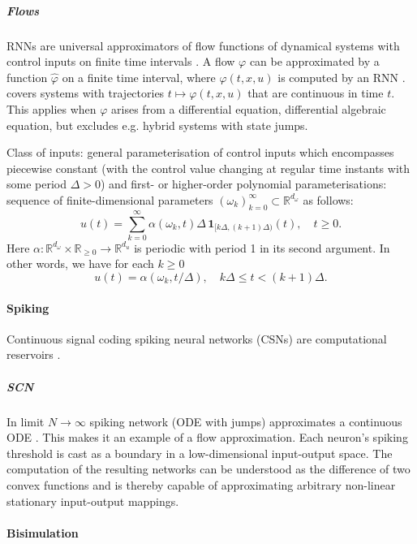 \documentclass{article}
\theoremstyle{definition}
\theoremstyle{remark}
\begin{document}
\subparagraph{Flows}
RNNs are universal approximators of flow  functions of dynamical systems  with control inputs on finite time intervals  \citep{aguiar2023}.
A flow $\varphi$ can be approximated by a function $\hat\varphi$ on a finite time interval, where $\hat \varphi(t, x, u)$ is computed by an RNN \citep{aguiar2023}. 
\citet{aguiar2023} covers systems with trajectories $t\mapsto\varphi(t, x, u)$ that are continuous in time $t$.
This applies when $\varphi$ arises from a differential equation, differential algebraic equation, but excludes e.g. hybrid systems with state jumps.

Class of inputs: general parameterisation of control inputs which encompasses piecewise constant (with the control value changing at regular time instants with some period $\Delta > 0$) and first- or higher-order polynomial parameterisations: 
sequence of finite-dimensional parameters \((\omega_k)_{k=0}^{\infty} \subset \mathbb{R}^{d_\omega}\) as follows:
\[
u(t) = \sum_{k=0}^{\infty} \alpha \left( \omega_k, t \right) \Delta \, \mathbf{1}_{[k\Delta,(k+1)\Delta)}(t), \quad t \geq 0.
\]
Here \(\alpha : \mathbb{R}^{d_\omega} \times \mathbb{R}_{\geq 0} \rightarrow \mathbb{R}^{d_u}\) is periodic with period 1 in its second argument. In other words, we have for each \(k \geq 0\)
\[
u(t) = \alpha(\omega_k, t/\Delta), \quad k\Delta \leq t < (k + 1)\Delta.
\]



\paragraph{Spiking}
Continuous signal coding spiking neural networks (CSNs) are computational reservoirs \citep{thalmeier2016learning}.

\subparagraph{SCN}
In limit $N\rightarrow\infty$ spiking network (ODE with jumps) approximates a continuous ODE \citep{podlaski2024approximating}. 
This makes it  an example of a flow approximation.
Each neuron’s spiking threshold is cast as a boundary in a low-dimensional input-output space.
The computation of the resulting networks can be understood as the difference of two convex functions and is thereby capable of approximating arbitrary non-linear stationary input-output mappings.




\paragraph{Bisimulation}
\citep{vanderschaft2004bisimulation}
\citep{vanderschaft2004equivalence}
\citep{zamani2014symbolic}
\end{document}
